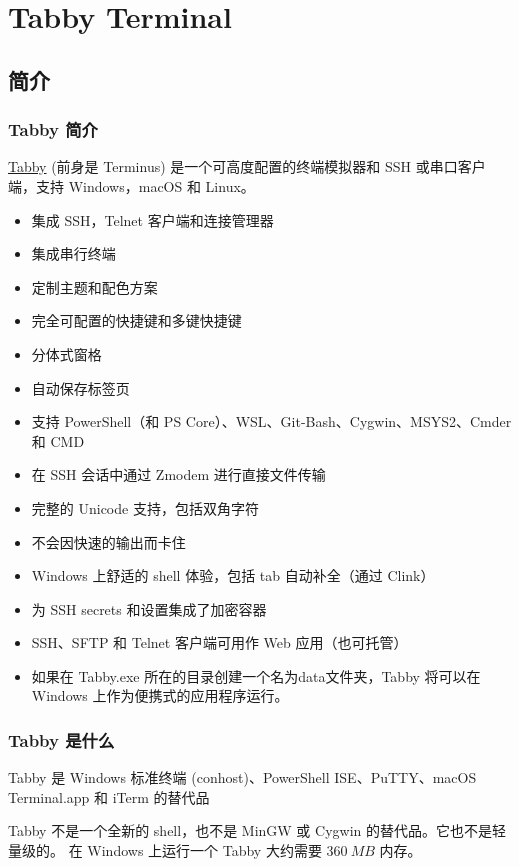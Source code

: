 \documentclass[xcolor=table,dvipsnames,svgnames,aspectratio=169]{ctexbeamer}
\begin{document}
\section{Tabby Terminal}

\subsection{简介}

\begin{frame}[allowframebreaks]
  \frametitle{Tabby 简介}

  \href{https://github.com/Eugeny/tabby}{Tabby} (前身是 Terminus) 是一个可高度配置的终端模拟器和 SSH 或串口客户端，支持 Windows，macOS 和 Linux。

  \begin{itemize}
    \item 集成 SSH，Telnet 客户端和连接管理器
    \item 集成串行终端
    \item 定制主题和配色方案
    \item 完全可配置的快捷键和多键快捷键
    \item 分体式窗格
    \item 自动保存标签页
    \item 支持 PowerShell（和 PS Core）、WSL、Git-Bash、Cygwin、MSYS2、Cmder 和 CMD
    \item 在 SSH 会话中通过 Zmodem 进行直接文件传输
    \item 完整的 Unicode 支持，包括双角字符
    \item 不会因快速的输出而卡住
    \item Windows 上舒适的 shell 体验，包括 tab 自动补全（通过 Clink）
    \item 为 SSH secrets 和设置集成了加密容器
    \item SSH、SFTP 和 Telnet 客户端可用作 Web 应用（也可托管）
    \item 如果在 Tabby.exe 所在的目录创建一个名为data文件夹，Tabby 将可以在 Windows 上作为便携式的应用程序运行。
  \end{itemize}

\end{frame}

\begin{frame}
  \frametitle{Tabby 是什么}

Tabby 是 Windows 标准终端 (conhost)、PowerShell ISE、PuTTY、macOS Terminal.app 和 iTerm 的替代品

Tabby 不是一个全新的 shell，也不是 MinGW 或 Cygwin 的替代品。它也不是轻量级的。 在 Windows 上运行一个 Tabby 大约需要 $\SI{360}{MB}$ 内存。
\end{frame}
\end{document}
